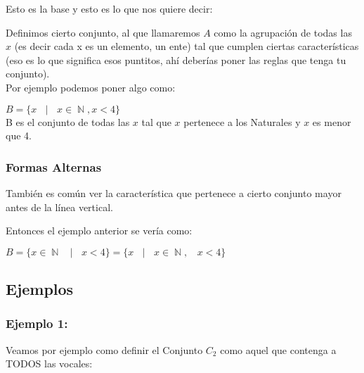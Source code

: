 \documentclass[12pt]{report}                                    %
\DeclareMathOperator \Space {\quad}                             %
\DeclareMathOperator \MiniSpace {\ }                            %
\newcommand \Such {\MiniSpace|\MiniSpace}                       %
\DeclareMathOperator \Naturals {\mathbb{N}}                     %
\begin{document}
                    Esto es la base y esto es lo que nos quiere decir:

                    Definimos cierto conjunto, al que llamaremos $A$ como la agrupación de todas las $x$
                    (es decir cada x es un elemento, un ente) tal que cumplen ciertas características
                    (eso es lo que significa esos puntitos, ahí deberías poner las reglas que tenga
                    tu conjunto). \\

                    Por ejemplo podemos poner algo como:

                    $B = \{ x \Such x \in \Naturals, x < 4 \}$\\

                    B es el conjunto de todas las $x$ tal que $x$ pertenece a los Naturales
                    y $x$ es menor que 4.


                \subsubsection*{Formas Alternas}
                
                    También es común ver la característica que pertenece a cierto conjunto mayor
                    antes de la línea vertical.

                    Entonces el ejemplo anterior se vería como:

                    $B = \{ x \in \Naturals \Such x < 4 \} = \{ x \Such x \in \Naturals, \MiniSpace x < 4 \} $


                
            \clearpage
            \subsection{Ejemplos} 

            \subsubsection*{Ejemplo 1:}

                Veamos por ejemplo como definir el Conjunto $C_2$ como aquel que contenga a
                TODOS las vocales:
\end{document}
